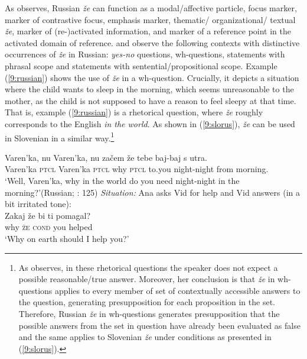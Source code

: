 \documentclass[output=paper,
modfonts,
newtxmath,
hidelinks
]{langscibook}
\begin{document}
\noindent As \cite{mccoy2003} observes, Russian \textit{že} can function as a modal/affective particle, focus marker, marker of contrastive focus, emphasis marker, thematic/ organizational/ textual \textit{že}, marker of (re-)activated information, and marker of a reference point in the activated domain of reference. \citet{hagstrommccoy2003} and \cite{mccoy2003} observe the following contexts with distinctive occurrences of \textit{že} in Russian: \textit{yes-no} questions, wh-questions, statements with phrasal scope and statements with sentential/propositional scope. Example (\ref{9:russian}) shows the use of \textit{že} in a wh-question. Crucially, it depicts a situation where the child wants to sleep in the morning, which seems unreasonable to the mother, as the child is not supposed to have a reason to feel sleepy at that time. That is, example (\ref{9:russian}) is a rhetorical question, where \textit{že} roughly corresponds to the English \textit{in the world}. As shown in (\ref{9:slorus}), \textit{že} can be used in Slovenian in a similar way.\footnote{As \cite{mccoy2003} observes, in these rhetorical questions the speaker does not expect a possible reasonable/true answer. Moreover, her conclusion is that \textit{že} in wh-questions applies to every member of set of contextually accessible answers to the question, generating presupposition for each proposition in the set. Therefore, Russian \textit{že} in wh-questions generates presupposition that the possible answers from the set in question have already been evaluated as false and the same applies to Slovenian \textit{že} under conditions as presented in (\ref{9:slorus}).}

\begin{exe}
\ex\gll Varen'ka, nu Varen'ka, nu začem že tebe baj-baj s utra. \\
Varen'ka \textsc{ptcl} Varen'ka \textsc{ptcl} why \textsc{ptcl} to.you night-night from morning.\\
\glt `Well, Varen'ka, why in the world do you need night-night in the morning?'\hfill(Russian; \citealt{mccoy2003}: 125) \label{9:russian}
\ex \textit{Situation:} Ana asks Vid for help and Vid answers (in a bit irritated tone): \label{9:slorus} \\
\gll Zakaj že bi ti pomagal? \\
	why \textsc{že}  \textsc{cond} you helped \\
\trans `Why on earth should I help you?'
\end{exe}
\end{document}
